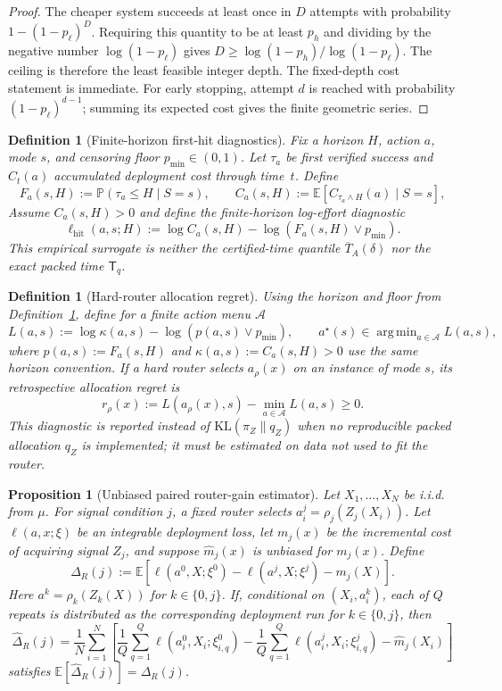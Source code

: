 \documentclass[10pt]{article}
\DeclareMathOperator*{\argmin}{arg\,min}
\theoremstyle{paperplain}
\newtheorem{proposition}[theorem]{Proposition}
\theoremstyle{paperdefinition}
\newtheorem{definition}[theorem]{Definition}
\theoremstyle{paperremark}
\newcommand{\KL}{\mathrm{KL}}
\newcommand{\E}{\mathbb{E}}
\newcommand{\Prb}{\mathbb{P}}
\newcommand{\cA}{\mathcal{A}}
\begin{document}
\begin{proof}
The cheaper system succeeds at least once in $D$ attempts with probability
$1-(1-p_\ell)^D$.
Requiring this quantity to be at least $p_h$ and dividing by the negative number
$\log(1-p_\ell)$ gives
$D\ge\log(1-p_h)/\log(1-p_\ell)$.
The ceiling is therefore the least feasible integer depth.
The fixed-depth cost statement is immediate.
For early stopping, attempt $d$ is reached with probability $(1-p_\ell)^{d-1}$; summing its expected cost gives the finite geometric series.
\end{proof}

\begin{definition}[Finite-horizon first-hit diagnostics]
\label{def:first-hit-diagnostics}
Fix a horizon $H$, action $a$, mode $s$, and censoring floor $p_{\min}\in(0,1)$.
Let $\tau_a$ be first verified success and $C_t(a)$ accumulated deployment cost through time~$t$.
Define
\[
F_a(s,H):=\Prb(\tau_a\le H\mid S=s),
\qquad
C_a(s,H):=\E[C_{\tau_a\wedge H}(a)\mid S=s],
\]
Assume $C_a(s,H)>0$ and define the finite-horizon log-effort diagnostic
\[
\ell_{\mathrm{hit}}(a,s;H)
:=
\log C_a(s,H)-\log(F_a(s,H)\vee p_{\min}).
\]
This empirical surrogate is neither the certified-time quantile $\overline T_A(\delta)$ nor the exact packed time $\mathsf T_q$.
\end{definition}

\begin{definition}[Hard-router allocation regret]
\label{def:allocation-regret}
Using the horizon and floor from Definition~\ref{def:first-hit-diagnostics}, define for a finite action menu $\cA$
\[
L(a,s):=\log\kappa(a,s)-\log(p(a,s)\vee p_{\min}),
\qquad
a^\star(s)\in\argmin_{a\in\cA}L(a,s),
\]
where $p(a,s):=F_a(s,H)$ and $\kappa(a,s):=C_a(s,H)>0$ use the same horizon convention.
If a hard router selects $a_\rho(x)$ on an instance of mode $s$, its retrospective allocation regret is
\[
r_\rho(x):=L(a_\rho(x),s)-\min_{a\in\cA}L(a,s)\ge0.
\]
This diagnostic is reported instead of $\KL(\pi_Z\|q_Z)$ when no reproducible packed allocation $q_Z$ is implemented; it must be estimated on data not used to fit the router.
\end{definition}

\begin{proposition}[Unbiased paired router-gain estimator]
\label{prop:paired-unbiased}
Let $X_1,\ldots,X_N$ be i.i.d. from $\mu$.
For signal condition $j$, a fixed router selects
$a_i^j=\rho_j(Z_j(X_i))$.
Let $\ell(a,x;\xi)$ be an integrable deployment loss, let $m_j(x)$ be the incremental cost of acquiring signal $Z_j$, and suppose $\widehat m_j(x)$ is unbiased for $m_j(x)$.
Define
\[
\Delta_R(j)
:=
\E\!\left[
\ell(a^0,X;\xi^0)-\ell(a^j,X;\xi^j)-m_j(X)
\right].
\]
Here $a^k=\rho_k(Z_k(X))$ for $k\in\{0,j\}$.
If, conditional on $(X_i,a_i^k)$, each of $Q$ repeats is distributed as the corresponding deployment run for $k\in\{0,j\}$, then
\[
\widehat\Delta_R(j)
=
\frac1N\sum_{i=1}^N
\left[
\frac1Q\sum_{q=1}^Q\ell(a_i^0,X_i;\xi_{i,q}^0)
-\frac1Q\sum_{q=1}^Q\ell(a_i^j,X_i;\xi_{i,q}^j)
-\widehat m_j(X_i)
\right]
\]
satisfies $\E[\widehat\Delta_R(j)]=\Delta_R(j)$.
\end{proposition}
\end{document}
